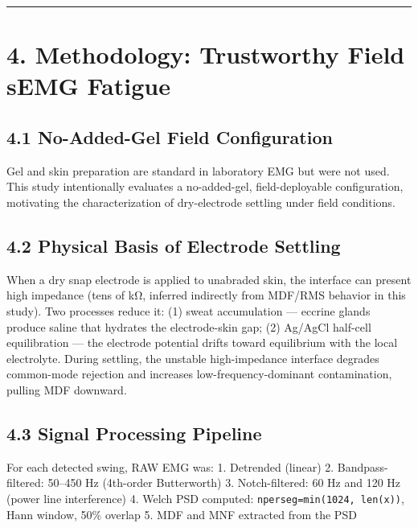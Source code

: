 \documentclass[sensors,article,submit,pdftex,moreauthors]{Definitions/mdpi}
\begin{document}
\begin{center}\rule{0.5\linewidth}{0.5pt}\end{center}

\section{4. Methodology: Trustworthy Field sEMG Fatigue}\label{methodology-trustworthy-field-semg-fatigue}

\subsection{4.1 No-Added-Gel Field Configuration}\label{no-added-gel-field-configuration}

Gel and skin preparation are standard in laboratory EMG \citep{hermens2000} but were not used. This study
intentionally evaluates a no-added-gel, field-deployable configuration, motivating the
characterization of dry-electrode settling under field conditions.

\subsection{4.2 Physical Basis of Electrode Settling}\label{physical-basis-of-electrode-settling}

When a dry snap electrode is applied to unabraded skin, the interface can present high
impedance (tens of kΩ, inferred indirectly from MDF/RMS behavior in this study). Two
processes reduce it: (1) sweat accumulation --- eccrine glands produce saline that hydrates
the electrode-skin gap; (2) Ag/AgCl half-cell equilibration --- the electrode potential drifts
toward equilibrium with the local electrolyte. During settling, the unstable high-impedance
interface degrades common-mode rejection and increases low-frequency-dominant contamination,
pulling MDF downward.

\subsection{4.3 Signal Processing Pipeline}\label{signal-processing-pipeline}

For each detected swing, RAW EMG was:
1. Detrended (linear)
2. Bandpass-filtered: 50--450 Hz (4th-order Butterworth)
3. Notch-filtered: 60 Hz and 120 Hz (power line interference)
4. Welch PSD computed: \texttt{nperseg=min(1024,\ len(x))}, Hann window, 50\% overlap
5. MDF and MNF extracted from the PSD
\end{document}
